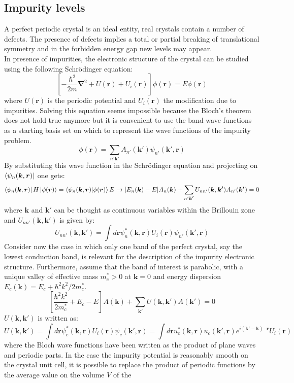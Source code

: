 \documentclass[10.75pt,a4paper,openright,bottom=2cm]{article}
\renewcommand{\Vec}[1]{\boldsymbol{#1}}
\begin{document}
\subsection{Impurity levels}
A perfect periodic crystal is an ideal entity, real crystals contain a number of defects. The presence of defects implies a total or partial breaking of translational symmetry and in the forbidden energy gap new levels may appear.\\
In presence of impurities, the electronic structure of the crystal can be studied using the following Schr\"odinger equation:
\[
\left[-\frac{\hbar^2}{2m}\Vec{\nabla}^2+U(\Vec{r})+U_i(\Vec{r})\right]\phi(\Vec{r})=E\phi(\Vec{r})
\]
where $U(\Vec{r})$ is the periodic potential and $U_i(\Vec{r})$ the modification due to impurities. Solving this equation seems impossible because the Bloch's theorem does not hold true anymore but it is convenient to use the band wave functions as a starting basis set on which to represent the wave functions of the impurity problem.
\[
\phi(\Vec{r})=\sum_{n'\Vec{k'}}A_{n'}(\Vec{k'})\psi_{n'}(\Vec{k'},\Vec{r})
\]
By substituting this wave function in the Schr\"odinger equation and projecting on $\bra{\psi_n(\Vec{k},\Vec{r})}$ one gets:
\[
\bra{\psi_n(\Vec{k},\Vec{r})}H\ket{\phi(\Vec{r})}=\bra{\psi_n(\Vec{k},\Vec{r})}\ket{\phi(\Vec{r})}E\to[E_n(\Vec{k})-E]A_n(\Vec{k})+\sum_{n'\Vec{k'}}U_{nn'}(\Vec{k},\Vec{k'})A_{n'}(\Vec{k'})=0
\]
where $\Vec{k}$ and $\Vec{k'}$ can be thought as continuous variables within the Brillouin zone and $U_{nn'}(\Vec{k},\Vec{k'})$ is given by:
\[
U_{nn'}(\Vec{k},\Vec{k'})=\int d\Vec{r}\psi_n^*(\Vec{k},\Vec{r})U_i(\Vec{r})\psi_{n'}(\Vec{k'},\Vec{r})
\]
Consider now the case in which only one band of the perfect crystal, say the lowest conduction band, is relevant for the description of the impurity electronic structure. Furthermore, assume that the band of interest is parabolic, with a unique valley of effective mass $m_c^*>0$ at $\Vec{k}=0$ and energy dispersion $E_c(\Vec{k})=E_c+\hbar^2k^2/2m_c^*$.
\begin{equation}
\label{imp}
\left[\frac{\hbar^2k^2}{2m_c^*}+E_c-E\right]A(\Vec{k})+\sum_{\Vec{k'}}U(\Vec{k},\Vec{k'})A(\Vec{k'})=0
\end{equation}
$U(\Vec{k},\Vec{k'})$ is written as:
\[
U(\Vec{k},\Vec{k'})=\int d\Vec{r}\psi_c^*(\Vec{k},\Vec{r})U_i(\Vec{r})\psi_c(\Vec{k'},\Vec{r})=\int d\Vec{r}u_c^*(\Vec{k},\Vec{r})u_c(\Vec{k'},\Vec{r})e^{i(\Vec{k'}-\Vec{k})\cdot\Vec{r}}U_i(\Vec{r})
\]
where the Bloch wave functions have been written as the product of plane waves and periodic parts. In the case the impurity potential is reasonably smooth on the crystal unit cell, it is possible to replace the product of periodic functions by the average value on the volume $V$ of the
\end{document}
